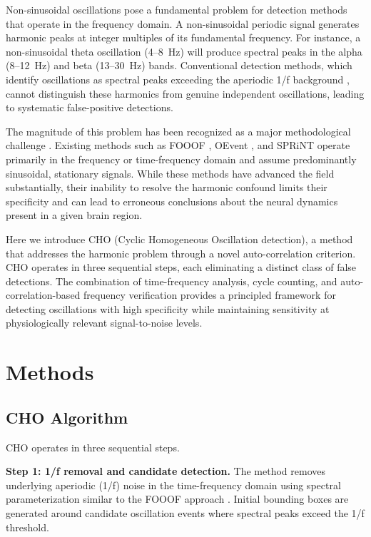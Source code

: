 \documentclass[12pt]{article}
\begin{document}
Non-sinusoidal oscillations pose a fundamental problem for detection methods that operate in the frequency domain. A non-sinusoidal periodic signal generates harmonic peaks at integer multiples of its fundamental frequency. For instance, a non-sinusoidal theta oscillation (4--8~Hz) will produce spectral peaks in the alpha (8--12~Hz) and beta (13--30~Hz) bands. Conventional detection methods, which identify oscillations as spectral peaks exceeding the aperiodic 1/f background \citep{donoghue2020parameterizing, miller2009power}, cannot distinguish these harmonics from genuine independent oscillations, leading to systematic false-positive detections.

The magnitude of this problem has been recognized as a major methodological challenge \citep{lozanosoldevilla2023harmonic}. Existing methods such as FOOOF \citep{donoghue2020parameterizing}, OEvent \citep{neymotin2022detecting}, and SPRiNT \citep{wilson2022sprint} operate primarily in the frequency or time-frequency domain and assume predominantly sinusoidal, stationary signals. While these methods have advanced the field substantially, their inability to resolve the harmonic confound limits their specificity and can lead to erroneous conclusions about the neural dynamics present in a given brain region.

Here we introduce CHO (Cyclic Homogeneous Oscillation detection), a method that addresses the harmonic problem through a novel auto-correlation criterion. CHO operates in three sequential steps, each eliminating a distinct class of false detections. The combination of time-frequency analysis, cycle counting, and auto-correlation-based frequency verification provides a principled framework for detecting oscillations with high specificity while maintaining sensitivity at physiologically relevant signal-to-noise levels.

\section{Methods}

\subsection{CHO Algorithm}

CHO operates in three sequential steps.

\textbf{Step 1: 1/f removal and candidate detection.} The method removes underlying aperiodic (1/f) noise in the time-frequency domain using spectral parameterization similar to the FOOOF approach \citep{donoghue2020parameterizing}. Initial bounding boxes are generated around candidate oscillation events where spectral peaks exceed the 1/f threshold.
\end{document}
